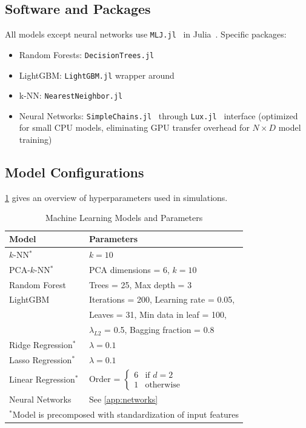 \documentclass[11pt,reqno,a4paper]{amsart}
\theoremstyle{definition}
\numberwithin{equation}{section}
\DeclareMathOperator{\1}{\mathbbm{1}}
\begin{document}
\subsection{Software and Packages}
All models except neural networks use \texttt{MLJ.jl}~\cite{Blaom2020} in Julia~\cite{bezanson2017julia}. Specific packages:
\begin{itemize}
  \item Random Forests: \texttt{DecisionTrees.jl}~\cite{ben_sadeghi_2022_7359268}
  \item LightGBM: \texttt{LightGBM.jl} wrapper around~\cite{lightgbm_github}
  \item k-NN: \texttt{NearestNeighbor.jl}
  \item Neural Networks: \texttt{SimpleChains.jl}~\cite{simplechains2023} through \texttt{Lux.jl}~\cite{pal2023lux} interface (optimized for small CPU models, eliminating GPU transfer overhead for $N\times D$ model training)
\end{itemize}

\subsection{Model Configurations}
\cref{table:models} gives an overview of hyperparameters used in simulations.
\begin{table}[ht]
  \centering
  \caption{Machine Learning Models and Parameters}
  \label{table:models}
  \begin{tabular}{ll}
    \toprule
    Model                 & Parameters                                   \\
    \midrule
    $k$-NN$^*$            & $k=10$                                       \\
    PCA-$k$-NN$^*$        & PCA dimensions = 6, $k=10$                   \\
    Random Forest         & Trees = 25, Max depth = 3                    \\
    LightGBM              & Iterations = 200, Learning rate = 0.05,      \\
                          & Leaves = 31, Min data in leaf = 100,         \\
                          & $\lambda_{L2}$ = 0.5, Bagging fraction = 0.8 \\
    Ridge Regression$^*$  & $\lambda = 0.1$                              \\
    Lasso Regression$^*$  & $\lambda = 0.1$                              \\
    Linear Regression$^*$ & Order = $\begin{cases}
                                         6 & \text{if } d=2   \\
                                         1 & \text{otherwise}
                                       \end{cases}$                \\
    Neural Networks       & See \cref{app:networks}                      \\
    \bottomrule
    \multicolumn{2}{l}{\small $^*$Model is precomposed with standardization of input features}
  \end{tabular}
\end{table}
\end{document}
